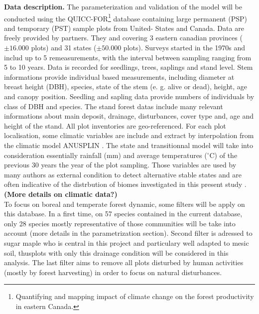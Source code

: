 \textbf{Data description.} The parameterization and validation of the model
will be conducted using the QUICC-FOR\footnote{Quantifying and mapping impact
of climate change on the forest productivity in eastern Canada.} database
containing large permanent (PSP) and temporary (PST) sample plots  from
United- States and Canada. Data are freely provided by partners. They and
covering 3 eastern canadian provinces ($\pm16.000$ plots) and 31 states
($\pm50.000$ plots). Surveys started in the 1970s and includ up to 5
remeasurements, with the interval between sampling ranging from 5 to 10 years.
Data is recorded for seedlings, trees, saplings and stand level. Stem
informations provide individual based measurements, including diameter at
breast height (DBH), species, state of the stem (e. g. alive or dead), height,
age and canopy position. Seedling and sapling data provide numbers of
individuals by class of DBH and species. The stand forest datas include many
relevant informations about main deposit, drainage, disturbances, cover type
and, age and height of the stand. All plot inventories are geo-referenced. For
each plot localisation, some climatic variables are include and extract by
interpolation from the climatic model ANUSPLIN \cite{McKenney2011}. The state
and transitionnal model will take into consideration essentially rainfall (mm)
and average temperatures (\ensuremath{^\circ}C) of the previous 30 years the
year of the plot sampling. Those variables are used by many authors as
external condition to detect alternative stable states and are often
indicative of the distrbution of biomes investigated in this present study
\cite{Goldblum2010,Hirota2011,Scheffer2012}. \textbf{(More details on climatic
data?)}\\

To focus on boreal and temperate forest dynamic, some filters will be apply on
this database.  In a first time, on 57 species contained in the current
database, only 28 species mostly representative of those communities will be
take into account (more details in the parametrization section).
Second filter is adressed to sugar maple who is central in this project and
particulary well adapted to mesic soil, thusplots with  only this drainage
condition will be considered in this analysis. The last filter aims to remove
all plots disturbed by human activities (mostly by forest harvesting) in order
to focus on natural disturbances. \\

